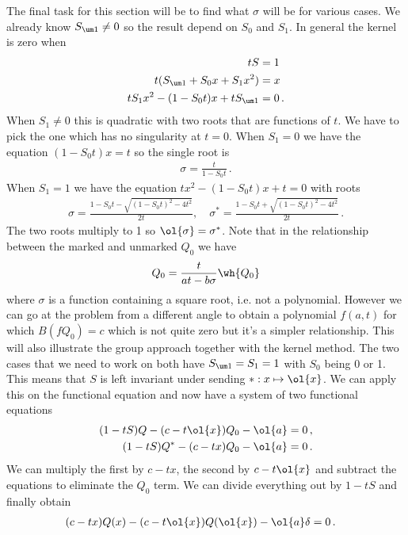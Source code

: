 The final task for this section will be to find what $\sigma$ will be for various cases. We already know $S_{\um 1} \neq 0$ so the result depend on $S_0$ and $S_1$. In general the kernel is zero when
\begin{align}\begin{split}
	t S &= 1\\
	t(S_{\um 1} + S_0 x + S_1 x^2) &= x\\
	tS_1 x^2 -(1-S_0t)x + tS_{\um 1} &= 0\,.
\end{split}\end{align}
When $S_1 \neq 0$ this is quadratic with two roots that are functions of $t$. We have to pick the one which has no singularity at $t = 0$. When $S_1 = 0$ we have the equation $(1-S_0t)x = t$ so the single root is
\begin{align}
	\sigma = \frac{t}{1-S_0t}\,.
\end{align}
When $S_1 = 1$ we have the equation $tx^2 -(1-S_0t)x + t = 0$ with roots
\begin{align}
\sigma = \frac{1-S_0t - \sqrt{(1-S_0t)^2-4t^2}}{2t}, \quad \sigma^\ast = \frac{1-S_0t + \sqrt{(1-S_0t)^2-4t^2}}{2t}\,.
\end{align}
The two roots multiply to 1 so $\ol{\sigma} = \sigma^\ast$. Note that in the relationship between the marked and unmarked $Q_0$ we have
\begin{align}
	Q_0 = \frac{t}{at-b\sigma}\wh{Q_0}
\end{align}
where $\sigma$ is a function containing a square root, i.e. not a polynomial. However we can go at the problem from a different angle to obtain a polynomial $f(a,t)$ for which $B(fQ_0) = c$ which is not quite zero but it's a simpler relationship. This will also illustrate the group approach together with the kernel method. The two cases that we need to work on both have $S_{\um 1} = S_1 = 1$ with $S_0$ being 0 or 1. This means that $S$ is left invariant under sending $\ast: x \mapsto \ol{x}$. We can apply this on the functional equation and now have a system of two functional equations
\begin{align}
	(1-tS)Q - (c -t\ol{x})Q_0 - \ol{a}=0\,,\\
	(1-tS)Q^\ast - (c -tx)Q_0 -\ol{a}=0\,.
\end{align}
We can multiply the first by $c -tx$, the second by $c -t\ol{x}$ and subtract the equations to eliminate the $Q_0$ term. We can divide everything out by $1-tS$ and finally obtain
\begin{align}
	(c-tx)Q(x) - (c-t\ol{x})Q(\ol{x}) -\ol{a}\delta &= 0\,.
\end{align}
